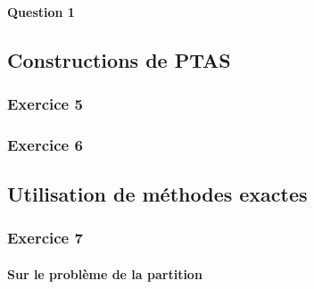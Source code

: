 \documentclass[a4paper, 12pt]{article}
\begin{document}
\paragraph{Question 1}

\subsection{Constructions de PTAS}

\subsubsection*{Exercice 5}

\subsubsection*{Exercice 6}

\subsection{Utilisation de méthodes exactes}

\subsubsection*{Exercice 7}

\paragraph{Sur le problème de la partition}
\end{document}
